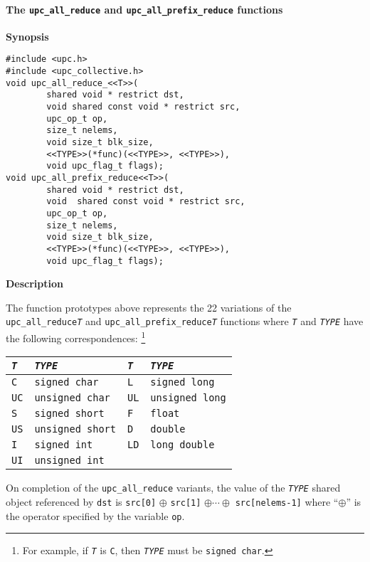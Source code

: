 \paragraph{The {\tt upc\_all\_reduce} and {\tt upc\_all\_prefix\_reduce} functions}
\label{reduction}

{\bf Synopsis} 

\npf 
\begin{verbatim}
#include <upc.h>
#include <upc_collective.h>
void upc_all_reduce_<<T>>(
        shared void * restrict dst,
        void shared const void * restrict src,
        upc_op_t op,
        size_t nelems,
        void size_t blk_size,
        <<TYPE>>(*func)(<<TYPE>>, <<TYPE>>),
        void upc_flag_t flags);
void upc_all_prefix_reduce<<T>>(
        shared void * restrict dst,
        void  shared const void * restrict src,
        upc_op_t op,
        size_t nelems,
        void size_t blk_size,
        <<TYPE>>(*func)(<<TYPE>>, <<TYPE>>),
        void upc_flag_t flags);
\end{verbatim}

{\bf Description} 

\np The function prototypes above represents the 22 variations of the
  {\tt upc\_all\_reduce{\em T}} and {\tt upc\_all\_prefix\_reduce{\em T}} 
  functions where {\tt{\em T}} and {\tt{\em TYPE}} have the following 
correspondences: \footnote{For example, if {\tt{\em T}} is {\tt C}, then 
{\tt{\em TYPE}} must be {\tt signed char}.}
\begin{center}
\begin{tabular}{ll|ll}
{\tt{\em T}} & {\tt{\em TYPE}} \hspace*{1.5in} &
{\tt{\em T}} & {\tt{\em TYPE}} \\ \hline
{\tt C} & {\tt signed char} &
{\tt L} & {\tt signed long} \\
{\tt UC} & {\tt unsigned char} &
{\tt UL} & {\tt unsigned long} \\
{\tt S} & {\tt signed short} &
{\tt F} & {\tt float} \\
{\tt US} & {\tt unsigned short} &
{\tt D} & {\tt double} \\
{\tt I} & {\tt signed int} &
{\tt LD} & {\tt long double} \\
{\tt UI} & {\tt unsigned int} &
\end{tabular}
\end{center}

\np On completion of the {\tt upc\_all\_reduce} variants, 
the value of the {\tt{\em TYPE}} shared object
referenced by {\tt dst} is
{\tt src[0]} $\oplus$ {\tt src[1]} $\oplus \cdots \oplus$
{\tt src[nelems-1]}
where ``$\oplus$'' is the operator specified by the variable {\tt op}.

